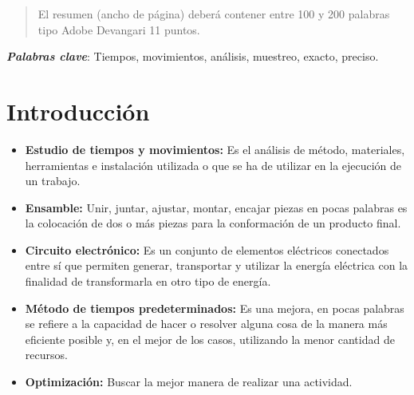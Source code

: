     \maketitle
    \thispagestyle{fancy}
    
    
    
    \begin{abstract}
    \noindent 
    El resumen (ancho de página) deberá contener entre 100 y 200 palabras tipo Adobe Devangari 11 puntos.
    
    \end{abstract}
    \textbf{\textit{Palabras clave}}: {Tiempos, movimientos, análisis, muestreo, exacto, preciso.}
    
    \section{Introducción}
    
    \begin{itemize}
        \item \textbf{{Estudio de tiempos y movimientos:}}
        Es el análisis de método, materiales, herramientas e instalación utilizada o que se ha de utilizar en la ejecución de un trabajo.
        \item \textbf{Ensamble:}
        Unir, juntar, ajustar, montar, encajar piezas en pocas palabras es la colocación de dos o más piezas para la conformación de un producto final.
        \item \textbf {Circuito electrónico:}
        Es un conjunto de elementos eléctricos conectados entre sí que permiten generar, transportar y utilizar la energía eléctrica con la finalidad de transformarla en otro tipo de energía.
        \item \textbf{Método de tiempos predeterminados:}
        Es una mejora, en pocas palabras se refiere a la capacidad de hacer o resolver alguna cosa de la manera más eficiente posible y, en el mejor de los casos, utilizando la menor cantidad de recursos.
        \item \textbf{Optimización:}
        Buscar la mejor manera de realizar una actividad.
        \end{itemize}
